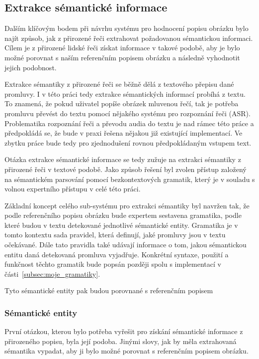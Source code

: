 \subsection{Extrakce sémantické informace}
Dalším klíčovým bodem při návrhu systému pro hodnocení popisu obrázku bylo najít způsob, jak z přirozené řeči extrahovat požadovanou sémantickou informaci.
Cílem je z přirozené lidské řeči získat informace v takové podobě, aby je bylo možné porovnat s naším referenčním popisem obrázku a
následně vyhodnotit jejich podobnost.

Extrakce sémantiky z přirozené řeči se běžně dělá z textového přepisu dané promluvy.
I v této práci tedy extrakce sémantických informací probíhá z textu.
To znamená, že pokud uživatel popíše obrázek mluvenou řečí, tak je potřeba promluvu převést do textu pomocí nějakého systému pro rozpoznání řeči (ASR).
Problematika rozpoznání řeči a převodu audia do textu je nad rámec této práce a předpokládá se, že bude v praxi řešena nějakou již existující implementací.
Ve zbytku práce bude tedy pro zjednodušení rovnou předpokládaným vstupem text.

Otázka extrakce sémantické informace se tedy zužuje na extrakci sémantiky z přirozené řeči v textové podobě.
Jako způsob řešení byl zvolen přístup založený na sémantickém parsování pomocí bezkontextových gramatik,
který je v souladu s volnou expertního přístupu v celé této práci.

Základní koncept celého sub-systému pro extrakci sémantiky byl navržen tak, že podle referenčního popisu obrázku bude expertem sestavena gramatika,
podle které budou v textu detekované jednotlivé sémantické entity.
Gramatika je v tomto kontextu sada pravidel, která definují, jaké promluvy jsou v textu očekávané.
Dále tato pravidla také udávají informace o tom, jakou sémantickou entitu daná detekovaná promluva vyjadřuje.
Konkrétní syntaxe, použití a funkčnost těchto gramatik bude popsán později spolu s implementací v části~\ref{subsec:moje_gramatiky}.

Tyto sémantické entity pak budou porovnané s referenčním popisem

\subsubsection{Sémantické entity}
První otázkou, kterou bylo potřeba vyřešit pro získání sémantické informace z přirozeného popisu, byla její podoba.
Jinými slovy, jak by měla extrahovaná sémantika vypadat, aby ji bylo možné porovnat s referenčním popisem obrázku.

